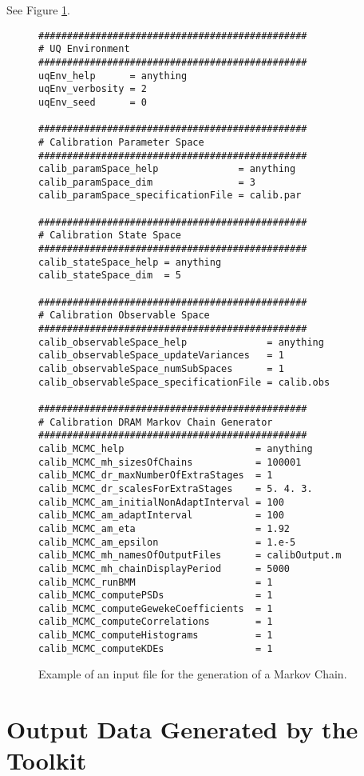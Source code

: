 See Figure \ref{fig-dram-input-file-ex}.

\begin{figure}[h!]
\begin{verbatim}
###############################################
# UQ Environment
###############################################
uqEnv_help      = anything
uqEnv_verbosity = 2
uqEnv_seed      = 0

###############################################
# Calibration Parameter Space
###############################################
calib_paramSpace_help              = anything
calib_paramSpace_dim               = 3
calib_paramSpace_specificationFile = calib.par

###############################################
# Calibration State Space
###############################################
calib_stateSpace_help = anything
calib_stateSpace_dim  = 5

###############################################
# Calibration Observable Space
###############################################
calib_observableSpace_help              = anything
calib_observableSpace_updateVariances   = 1
calib_observableSpace_numSubSpaces      = 1
calib_observableSpace_specificationFile = calib.obs

###############################################
# Calibration DRAM Markov Chain Generator
###############################################
calib_MCMC_help                       = anything
calib_MCMC_mh_sizesOfChains           = 100001
calib_MCMC_dr_maxNumberOfExtraStages  = 1
calib_MCMC_dr_scalesForExtraStages    = 5. 4. 3.
calib_MCMC_am_initialNonAdaptInterval = 100
calib_MCMC_am_adaptInterval           = 100
calib_MCMC_am_eta                     = 1.92
calib_MCMC_am_epsilon                 = 1.e-5
calib_MCMC_mh_namesOfOutputFiles      = calibOutput.m
calib_MCMC_mh_chainDisplayPeriod      = 5000
calib_MCMC_runBMM                     = 1
calib_MCMC_computePSDs                = 1
calib_MCMC_computeGewekeCoefficients  = 1
calib_MCMC_computeCorrelations        = 1
calib_MCMC_computeHistograms          = 1
calib_MCMC_computeKDEs                = 1
\end{verbatim}
\caption{Example of an input file for the generation of a Markov Chain.
}
\label{fig-dram-input-file-ex}
\end{figure}

\section{Output Data Generated by the Toolkit}\label{sc-gmc-dram-output}
$~$\\

